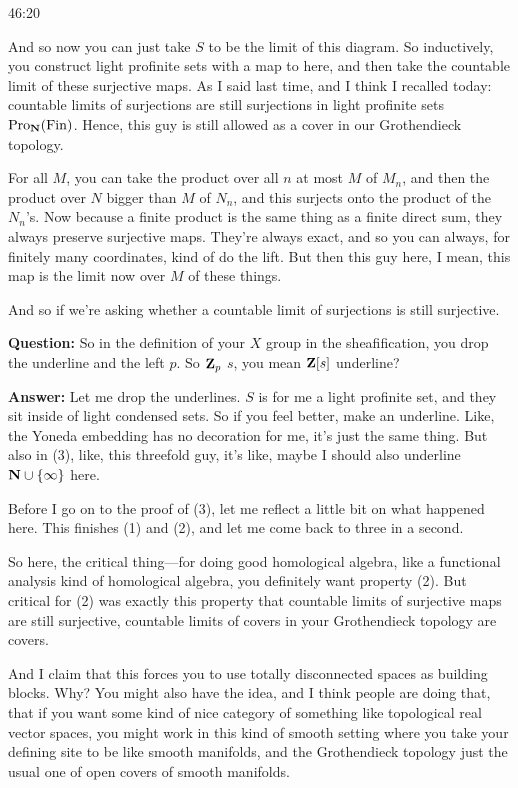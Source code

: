 \begin{unfinished}{46:20}
\begin{sketch}
And so now you can just take $S$ to be the limit of this diagram. 
So inductively, you construct light profinite sets with a map to here, and then take the countable limit of these surjective maps. As I said last time, and I think I recalled today: countable limits of surjections are still surjections in light profinite sets $\operatorname{Pro}_{\mathbf N}(\operatorname{Fin})$. Hence, this guy is still allowed as a cover in our Grothendieck topology.

\end{sketch}

For all $M$, you can take the product over all $n$ at most $M$ of $M_n$, and then the product over $N$ bigger than $M$ of $N_n$, and this surjects onto the product of the $N_n$'s. Now because a finite product is the same thing as a finite direct sum, they always preserve surjective maps. They're always exact, and so you can always, for finitely many coordinates, kind of do the lift. But then this guy here, I mean, this map is the limit now over $M$ of these things.

And so if we're asking whether a countable limit of surjections is still surjective.


\textbf{Question:} So in the definition of your $X$ group in the sheafification, you drop the underline and the left $p$. So $\mathbf Z_p$ $s$, you mean $\mathbf Z[s]$ underline? 

\textbf{Answer:} Let me drop the underlines. $S$ is for me a light profinite set, and they sit inside of light condensed sets. So if you feel better, make an underline. 
Like, the Yoneda embedding has no decoration for me, it's just the same thing. But also in (3), like, this threefold guy, it's like, maybe I should also underline $\mathbf N \cup \{\infty\}$ here. 

Before I go on to the proof of (3), let me reflect a little bit on what happened here. This finishes (1) and (2), and let me come back to three in a second.

So here, the critical thing---for doing good homological algebra, like a functional analysis kind of homological algebra, you definitely want property (2). But critical for (2) was exactly this property that countable limits of surjective maps are still surjective, countable limits of covers in your Grothendieck topology are covers.

And I claim that this forces you to use totally disconnected spaces as building blocks. Why? You might also have the idea, and I think people are doing that, that if you want some kind of nice category of something like topological real vector spaces, you might work in this kind of smooth setting where you take your defining site to be like smooth manifolds, and the Grothendieck topology just the usual one of open covers of smooth manifolds.


\end{unfinished}
